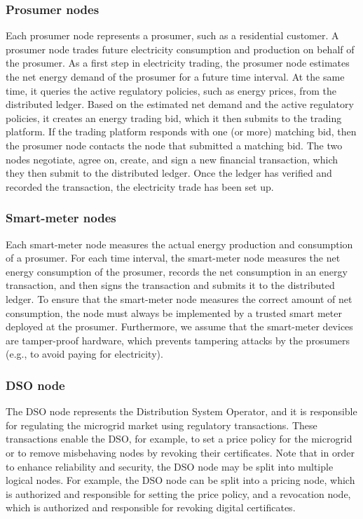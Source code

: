 \documentclass[sigconf]{acmart}
\begin{document}
\subsubsection{Prosumer nodes}
Each prosumer node represents a prosumer, such as a residential customer.
A prosumer node trades future electricity consumption and production on behalf of the prosumer.
As a first step in electricity trading, the prosumer node estimates the net energy demand of the prosumer for a future time interval.
At the same time, it queries the active regulatory policies, such as energy prices, from the distributed ledger.
Based on the estimated net demand and the active regulatory policies, it creates an energy trading bid, which it then submits to the trading platform.
If the trading platform responds with one (or more) matching bid, then the prosumer node contacts the node that submitted a matching bid.
The two nodes negotiate, agree on, create, and sign a new financial transaction, which they then submit to the distributed ledger.
Once the ledger has verified and recorded the transaction, the electricity trade has been set up.

\subsubsection{Smart-meter nodes}
Each smart-meter node measures the actual energy production and consumption of a prosumer.
For each time interval, the smart-meter node measures the net energy consumption of the prosumer, records the net consumption in an energy transaction, and then signs the transaction and submits it to the distributed ledger.
To ensure that the smart-meter node measures the correct amount of net consumption, the node must always be implemented by a trusted smart meter deployed at the prosumer.
Furthermore, we assume that the smart-meter devices are tamper-proof hardware, which prevents tampering attacks by the prosumers (e.g., to avoid paying for electricity).

\subsubsection{DSO node}
The DSO node represents the Distribution System Operator, and it is responsible for regulating the microgrid market using regulatory transactions.
These transactions enable the DSO, for example, to set a price policy for the microgrid or to remove misbehaving nodes by revoking their certificates.
Note that in order to enhance reliability and security, the DSO node may be split into multiple logical nodes.
For example, the DSO node can be split into a pricing node, which is authorized and responsible for setting the price policy, and a revocation node, which is authorized and responsible for revoking digital certificates.
\end{document}
